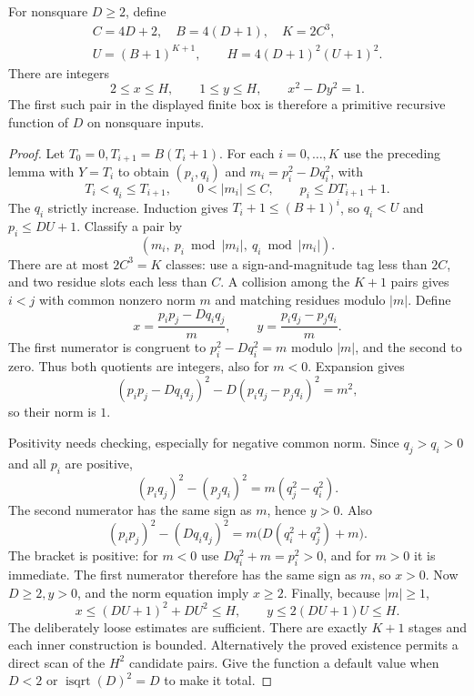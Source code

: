 \begin{theorem}\label{dio:pell-existence}
For nonsquare $D\geq2$, define
\[
 \begin{gathered}
 C=4D+2,\quad B=4(D+1),\quad K=2C^3,\\
 U=(B+1)^{K+1},\qquad H=4(D+1)^2(U+1)^2.
 \end{gathered}
\]
There are integers
\[
 2\leq x\leq H,\qquad1\leq y\leq H,\qquad x^2-Dy^2=1.
\]
The first such pair in the displayed finite box is therefore a primitive
recursive function of $D$ on nonsquare inputs.
\end{theorem}
\begin{proof}
Let $T_0=0,T_{i+1}=B(T_i+1)$. For each $i=0,\ldots,K$ use the
preceding lemma with $Y=T_i$ to obtain $(p_i,q_i)$ and
$m_i=p_i^2-Dq_i^2$, with
\[
 T_i<q_i\leq T_{i+1},\qquad 0<|m_i|\leq C,\qquad
 p_i\leq DT_{i+1}+1.
\]
The $q_i$ strictly increase. Induction gives
$T_i+1\leq(B+1)^i$, so $q_i<U$ and $p_i\leq DU+1$.
Classify a pair by
\[
 (m_i,\ p_i\bmod|m_i|,\ q_i\bmod|m_i|).
\]
There are at most $2C^3=K$ classes: use a sign-and-magnitude tag
less than $2C$, and two residue slots each less than $C$.
A collision among the $K+1$ pairs gives $i<j$ with common nonzero
norm $m$ and matching residues modulo $|m|$.
Define
\[
 x=\frac{p_ip_j-Dq_iq_j}{m},\qquad
 y=\frac{p_iq_j-p_jq_i}{m}.
\]
The first numerator is congruent to
$p_i^2-Dq_i^2=m$ modulo $|m|$, and the second to zero.
Thus both quotients are integers, also for $m<0$.
Expansion gives
\[
 (p_ip_j-Dq_iq_j)^2-D(p_iq_j-p_jq_i)^2=m^2,
\]
so their norm is $1$.

Positivity needs checking, especially for negative common norm.
Since $q_j>q_i>0$ and all $p_i$ are positive,
\[
 (p_iq_j)^2-(p_jq_i)^2=m(q_j^2-q_i^2).
\]
The second numerator has the same sign as $m$, hence $y>0$.
Also
\[
 (p_ip_j)^2-(Dq_iq_j)^2
 =m\bigl(D(q_i^2+q_j^2)+m\bigr).
\]
The bracket is positive: for $m<0$ use
$Dq_i^2+m=p_i^2>0$, and for $m>0$ it is immediate.
The first numerator therefore has the same sign as $m$, so $x>0$.
Now $D\geq2,y>0$, and the norm equation imply $x\geq2$.
Finally, because $|m|\geq1$,
\[
 x\leq(DU+1)^2+DU^2\leq H,\qquad
 y\leq2(DU+1)U\leq H.
\]
The deliberately loose estimates are sufficient.
There are exactly $K+1$ stages and each inner construction is bounded.
Alternatively the proved existence permits a direct scan of the
$H^2$ candidate pairs. Give the function a default value when
$D<2$ or $\operatorname{isqrt}(D)^2=D$ to make it total.
\end{proof}

